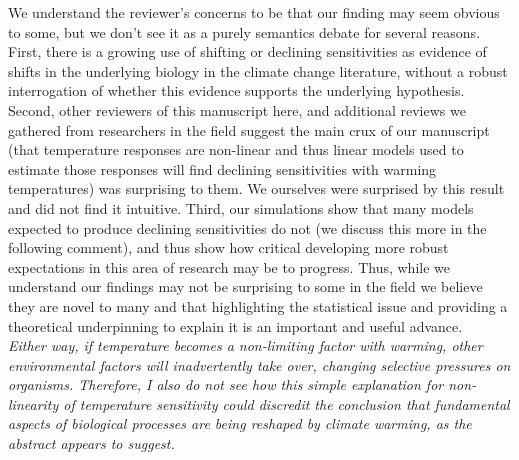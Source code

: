 \documentclass[11pt,letter]{article}
\begin{document}
We understand the reviewer's concerns to be that our finding may seem obvious to some, but we don't see it as a purely semantics debate for several reasons. First, there is a growing use of shifting or declining sensitivities as evidence of shifts in the underlying biology in the climate change literature, without a robust interrogation of whether this evidence supports the underlying hypothesis. Second, other reviewers of this manuscript here, and additional reviews we gathered from researchers in the field suggest the main crux of our manuscript (that temperature responses are non-linear and thus linear models used to estimate those responses will find declining sensitivities with warming temperatures) was surprising to them. We ourselves were surprised by this result and did not find it intuitive. Third, our simulations show that many models expected to produce declining sensitivities do not (we discuss this more in the following comment), and thus show how critical developing more robust expectations in this area of research may be to progress. Thus, while we understand our findings may not be surprising to some in the field we believe they are novel to many and that highlighting the statistical issue and providing a theoretical underpinning to explain it is an important and useful advance.\\

\emph{Either way, if temperature becomes a non-limiting factor with warming, other environmental factors will inadvertently take over, changing selective pressures on organisms. Therefore, I also do not see how this simple explanation for non-linearity of temperature sensitivity could discredit the conclusion that fundamental aspects of biological processes are being reshaped by climate warming, as the abstract appears to suggest.}\\
\end{document}
